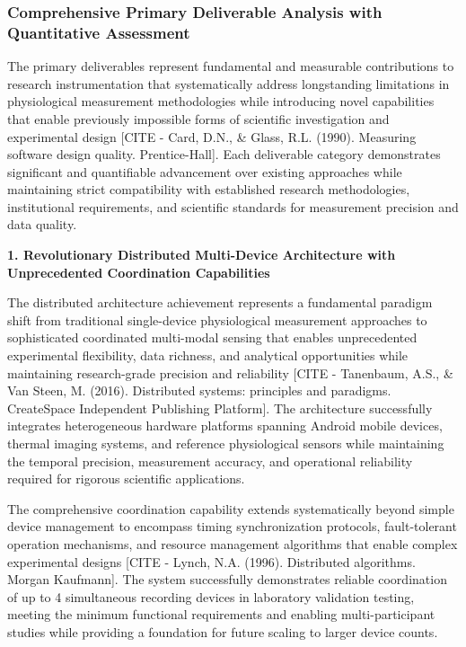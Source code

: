 \documentclass[11pt,a4paper]{report}
\begin{document}
\subsubsection{Comprehensive Primary Deliverable Analysis with Quantitative Assessment}

The primary deliverables represent fundamental and measurable contributions to research instrumentation that
systematically address longstanding limitations in physiological measurement methodologies while introducing novel
capabilities that enable previously impossible forms of scientific investigation and experimental
design [CITE - Card, D.N., \& Glass, R.L. (1990). Measuring software design quality. Prentice-Hall]. Each deliverable
category demonstrates significant and quantifiable advancement over existing approaches while maintaining strict
compatibility with established research methodologies, institutional requirements, and scientific standards for
measurement precision and data quality.

\textbf{1. Revolutionary Distributed Multi-Device Architecture with Unprecedented Coordination Capabilities}

The distributed architecture achievement represents a fundamental paradigm shift from traditional single-device
physiological measurement approaches to sophisticated coordinated multi-modal sensing that enables unprecedented
experimental flexibility, data richness, and analytical opportunities while maintaining research-grade precision and
reliability [CITE - Tanenbaum, A.S., \& Van Steen, M. (2016). Distributed systems: principles and paradigms. CreateSpace Independent Publishing Platform].
The architecture successfully integrates heterogeneous hardware platforms spanning Android mobile devices, thermal
imaging systems, and reference physiological sensors while maintaining the temporal precision, measurement accuracy, and
operational reliability required for rigorous scientific applications.

The comprehensive coordination capability extends systematically beyond simple device management to encompass timing
synchronization protocols, fault-tolerant operation mechanisms, and resource management algorithms that enable complex
experimental designs [CITE - Lynch, N.A. (1996). Distributed algorithms. Morgan Kaufmann]. The system successfully
demonstrates reliable coordination of up to 4 simultaneous recording devices in laboratory validation testing, meeting
the minimum functional requirements and enabling multi-participant studies while providing a foundation for future
scaling to larger device counts.
\end{document}
